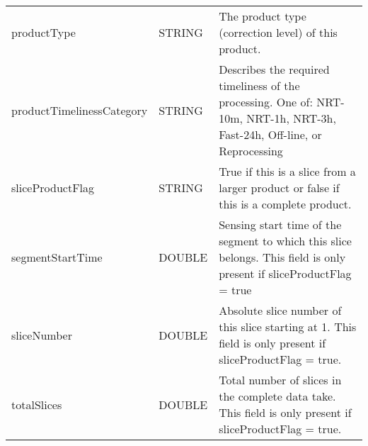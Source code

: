 \documentclass[lettersize,journal]{IEEEtran}
\begin{document}
\begin{table*}[h]
{\begin{tabular}{llp{12cm}}
productType                                      & STRING                            & The product type (correction level) of this product.                                                                                                                    \\
productTimelinessCategory                        & STRING                            & Describes the required timeliness of the processing. One of: NRT-10m, NRT-1h, NRT-3h, Fast-24h, Off-line, or Reprocessing                                               \\
sliceProductFlag                                 & STRING                            & True if this is a slice from a larger product or false if this is a complete product.                                                                                   \\
segmentStartTime                                 & DOUBLE                            & Sensing start time of the segment to which this slice belongs. This field is only present if sliceProductFlag = true                                                    \\
sliceNumber                                      & DOUBLE                            & Absolute slice number of this slice starting at 1. This field is only present if sliceProductFlag = true.                                                               \\
totalSlices                                      & DOUBLE                            & Total number of slices in the complete data take. This field is only present if sliceProductFlag = true.                                                                \\ \hline
\end{tabular}
}
\end{table*}
\end{document}
